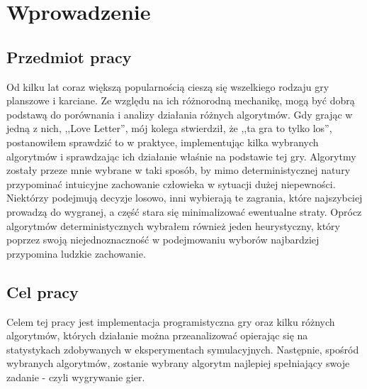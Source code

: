 \chapter{Wprowadzenie}
\label{cha:rozdz1}
\section{Przedmiot pracy}
\label{sec:przedmiotPracy}

Od kilku lat coraz większą popularnością cieszą się wszelkiego rodzaju gry planszowe i karciane. Ze względu na ich różnorodną mechanikę, mogą być dobrą podstawą do porównania i analizy działania różnych algorytmów. Gdy grając w jedną z nich, ,,Love Letter'', mój kolega stwierdził, że ,,ta gra to tylko los'', postanowiłem sprawdzić to w praktyce, implementując kilka wybranych algorytmów i sprawdzając ich działanie właśnie na podstawie tej gry. 
Algorytmy zostały przeze mnie wybrane w taki sposób, by mimo deterministycznej natury przypominać intuicyjne zachowanie człowieka w sytuacji dużej niepewności. Niektórzy podejmują decyzje losowo, inni wybierają te zagrania, które najszybciej prowadzą do wygranej, a część stara się minimalizować ewentualne straty. Oprócz algorytmów deterministycznych wybrałem również jeden heurystyczny, który poprzez swoją niejednoznaczność w podejmowaniu wyborów najbardziej przypomina ludzkie zachowanie.

\section{Cel pracy}
\label{sec:zawartoscPracy}
Celem tej pracy jest implementacja programistyczna gry oraz kilku różnych algorytmów, których działanie można przeanalizować opierając się na statystykach zdobywanych w eksperymentach symulacyjnych. Następnie, spośród wybranych algorytmów, zostanie wybrany algorytm najlepiej spełniający swoje zadanie - czyli wygrywanie gier.

